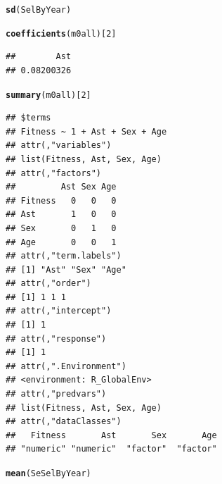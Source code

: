 \documentclass{article}\usepackage[]{graphicx}\usepackage[]{color}
\makeatletter
\newcommand{\hlnum}[1]{\textcolor[rgb]{0.686,0.059,0.569}{#1}}%
\newcommand{\hlstd}[1]{\textcolor[rgb]{0.345,0.345,0.345}{#1}}%
\newcommand{\hlkwd}[1]{\textcolor[rgb]{0.737,0.353,0.396}{\textbf{#1}}}%
\newenvironment{kframe}{%
 \def\at@end@of@kframe{}%
 \ifinner\ifhmode%
  \def\at@end@of@kframe{\end{minipage}}%
  \begin{minipage}{\columnwidth}%
 \fi\fi%
 \def\FrameCommand##1{\hskip\@totalleftmargin \hskip-\fboxsep
 \colorbox{shadecolor}{##1}\hskip-\fboxsep
     \hskip-\linewidth \hskip-\@totalleftmargin \hskip\columnwidth}%
 \MakeFramed {\advance\hsize-\width
   \@totalleftmargin\z@ \linewidth\hsize
   \@setminipage}}%
 {\par\unskip\endMakeFramed%
 \at@end@of@kframe}
\newenvironment{knitrout}{}{} %
\makeatother
\begin{document}
\begin{knitrout}
\color{fgcolor}\begin{kframe}
\begin{alltt}
\hlkwd{sd}\hlstd{(SelByYear)}
\end{alltt}


{\ttfamily\noindent\bfseries\color{errorcolor}{\#\# Error in is.data.frame(x): objet 'SelByYear' introuvable}}\begin{alltt}
\hlkwd{coefficients}\hlstd{(m0all)[}\hlnum{2}\hlstd{]}
\end{alltt}
\begin{verbatim}
##        Ast 
## 0.08200326
\end{verbatim}
\begin{alltt}
\hlkwd{summary}\hlstd{(m0all)[}\hlnum{2}\hlstd{]}
\end{alltt}
\begin{verbatim}
## $terms
## Fitness ~ 1 + Ast + Sex + Age
## attr(,"variables")
## list(Fitness, Ast, Sex, Age)
## attr(,"factors")
##         Ast Sex Age
## Fitness   0   0   0
## Ast       1   0   0
## Sex       0   1   0
## Age       0   0   1
## attr(,"term.labels")
## [1] "Ast" "Sex" "Age"
## attr(,"order")
## [1] 1 1 1
## attr(,"intercept")
## [1] 1
## attr(,"response")
## [1] 1
## attr(,".Environment")
## <environment: R_GlobalEnv>
## attr(,"predvars")
## list(Fitness, Ast, Sex, Age)
## attr(,"dataClasses")
##   Fitness       Ast       Sex       Age 
## "numeric" "numeric"  "factor"  "factor"
\end{verbatim}
\begin{alltt}
\hlkwd{mean}\hlstd{(SeSelByYear)}
\end{alltt}



\end{kframe}
\end{knitrout}
\end{document}
